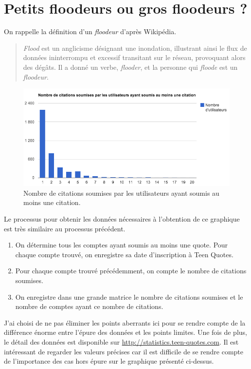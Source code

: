 \documentclass{report}
\begin{document}
	\section{Petits floodeurs ou gros floodeurs ?}
	On rappelle la définition d'un \textit{floodeur} d'après Wikipédia.
	\begin{quote}
		\textit{Flood} est un anglicisme désignant une inondation, illustrant ainsi le flux de données ininterrompu et excessif transitant sur le réseau, provoquant alors des dégâts. Il a donné un verbe, \textit{flooder}, et la personne qui \textit{floode} est un \textit{floodeur}.
	\end{quote}

	\begin{figure}[H]
		\center
		\includegraphics[width=450px]{images/citationsSoumisesParUtilisateur.png}
		\caption{Nombre de citations soumises par les utilisateurs ayant soumis au moins une citation.}
	\end{figure}
	Le processus pour obtenir les données nécessaires à l'obtention de ce graphique est très similaire au processus précédent.
	\vspace{10px}
	\begin{enumerate}
		\item On détermine tous les comptes ayant soumis au moins une quote. Pour chaque compte trouvé, on enregistre sa date d'inscription à Teen Quotes.
		\item Pour chaque compte trouvé précédemment, on compte le nombre de citations soumises.
		\item On enregistre dans une grande matrice le nombre de citations soumises et le nombre de comptes ayant ce nombre de citations.
	\end{enumerate}
	\vspace{10px}
	J'ai choisi de ne pas éliminer les points aberrants ici pour se rendre compte de la différence énorme entre l'épure des données et les points limites. Une fois de plus, le détail des données est disponible sur \mbox{\url{http://statistics.teen-quotes.com}}. Il est intéressant de regarder les valeurs précises car il est difficile de se rendre compte de l'importance des cas hors épure sur le graphique présenté ci-dessus.
\end{document}
